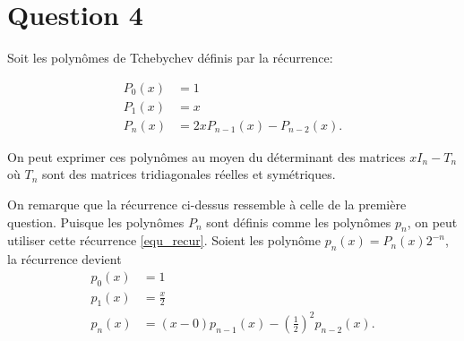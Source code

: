 \section*{Question 4}
Soit les polynômes de Tchebychev définis par la récurrence:

\begin{align*}
  P_0(x) & = 1\\
  P_1(x) & = x\\
  P_n(x) & = 2xP_{n-1}(x) - P_{n-2}(x).
\end{align*}

On peut exprimer ces polynômes au moyen du déterminant des matrices $xI_n - T_n$ où $T_n$ sont des matrices tridiagonales réelles et symétriques.

On remarque que la récurrence ci-dessus ressemble à celle de la première question.
Puisque les polynômes $P_n$ sont définis comme les polynômes $p_n$,
on peut utiliser cette récurrence \eqref{equ_recur}.
Soient les polynôme $p_n(x) = P_n(x)2^{-n}$, la récurrence devient
\begin{align*}
  p_0(x) & = 1\\
  p_1(x) & = \frac{x}{2}\\
  p_n(x) & = (x - 0)p_{n-1}(x) - \left(\frac{1}{2}\right)^2p_{n-2}(x).
\end{align*}

